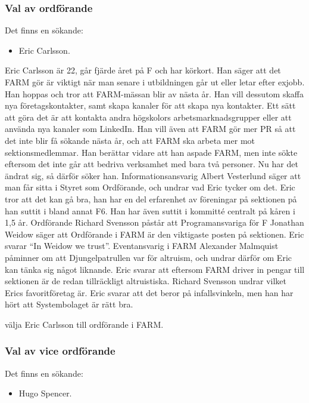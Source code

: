 \documentclass[hidelinks]{sektionsmote} %
\begin{document}
\subsubsection{Val av ordförande}
Det finns en sökande:
\begin{itemize}
    \item Eric Carlsson.
\end{itemize}

Eric Carlsson är 22, går fjärde året på F och har körkort.
Han säger att det FARM gör är viktigt när man senare i utbildningen går ut eller letar efter exjobb.
Han hoppas och tror att FARM-mässan blir av nästa år.
Han vill dessutom skaffa nya företagskontakter, samt skapa kanaler för att skapa nya kontakter.
Ett sätt att göra det är att kontakta andra högskolors arbetsmarknadsgrupper eller att använda nya kanaler som LinkedIn.
Han vill även att FARM gör mer PR så att det inte blir få sökande nästa år, och att FARM ska arbeta mer mot sektionsmedlemmar.
Han berättar vidare att han aspade FARM, men inte sökte eftersom det inte går att bedriva verksamhet med bara två personer.
Nu har det ändrat sig, så därför söker han.
Informationsansvarig Albert Vesterlund säger att man får sitta i Styret som Ordförande, och undrar vad Eric tycker om det.
Eric tror att det kan gå bra, han har en del erfarenhet av föreningar på sektionen på han suttit i bland annat F6.
Han har även suttit i kommitté centralt på kåren i 1,5 år.
Ordförande Richard Svensson påstår att Programansvariga för F Jonathan Weidow säger att Ordförande i FARM är den viktigaste posten på sektionen.
Eric svarar \enquote{In Weidow we trust}.
Eventansvarig i FARM Alexander Malmquist påminner om att Djungelpatrullen var för altruism, och undrar därför om Eric kan tänka sig något liknande.
Eric svarar att eftersom FARM driver in pengar till sektionen är de redan tillräckligt altruistiska.
Richard Svensson undrar vilket Erics favoritföretag är.
Eric svarar att det beror på infallsvinkeln, men han har hört att Systembolaget är rätt bra.

\begin{beslut}
  \item välja Eric Carlsson till ordförande i FARM.
\end{beslut}

\subsubsection{Val av vice ordförande}
Det finns en sökande:
\begin{itemize}
    \item Hugo Spencer.
\end{itemize}
\end{document}
